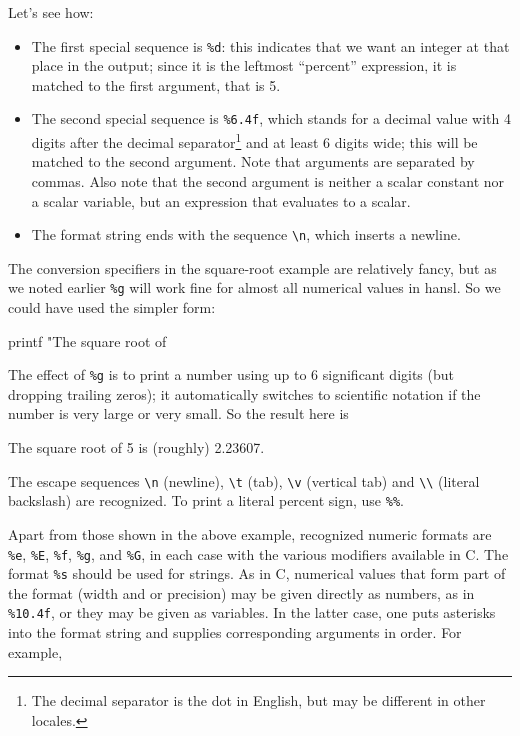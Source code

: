 Let's see how:
\begin{itemize}
\item The first special sequence is \verb|%d|: this indicates that we
  want an integer at that place in the output; since it is the
  leftmost ``percent'' expression, it is matched to the first
  argument, that is 5.
\item The second special sequence is \verb|%6.4f|, which stands for a
  decimal value with 4 digits after the decimal separator\footnote{The
    decimal separator is the dot in English, but may be different in
    other locales.} and at least 6 digits wide; this will be matched
  to the second argument. Note that arguments are separated by
  commas. Also note that the second argument is neither a scalar
  constant nor a scalar variable, but an expression that evaluates to
  a scalar.
\item The format string ends with the sequence \verb|\n|, which
  inserts a newline.
\end{itemize}

The conversion specifiers in the square-root example are relatively
fancy, but as we noted earlier \texttt{\%g} will work fine for
almost all numerical values in hansl. So we could have used the
simpler form:
\begin{code}
printf "The square root of %
\end{code}
The effect of \texttt{\%g} is to print a number using up to 6
significant digits (but dropping trailing zeros); it automatically
switches to scientific notation if the number is very large or very
small. So the result here is
\begin{code}
The square root of 5 is (roughly) 2.23607.
\end{code}

The escape sequences \verb|\n| (newline), \verb|\t| (tab), \verb|\v|
(vertical tab) and \verb|\\| (literal backslash) are recognized. To
print a literal percent sign, use \verb|%%|.

Apart from those shown in the above example, recognized numeric
formats are \verb|%e|, \verb|%E|, \verb|%f|, \verb|%g|, and \verb|%G|,
in each case with the various modifiers available in C. The format
\verb|%s| should be used for strings. As in C, numerical values that
form part of the format (width and or precision) may be given directly
as numbers, as in \verb|%10.4f|, or they may be given as variables. In
the latter case, one puts asterisks into the format string and
supplies corresponding arguments in order. For example,

